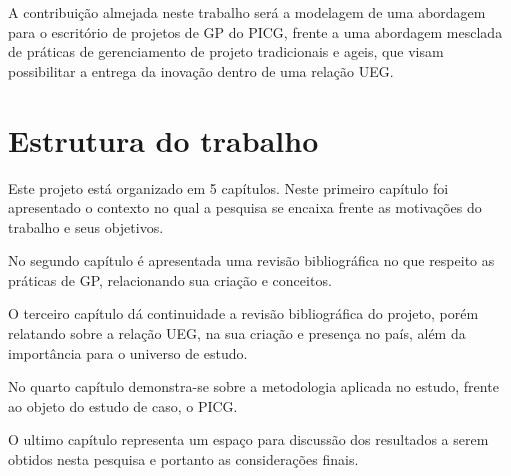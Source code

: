 A contribuição almejada neste trabalho será a modelagem de uma abordagem para o escritório de projetos de GP do PICG, frente a uma abordagem mesclada de práticas de gerenciamento de projeto tradicionais e ageis, que visam possibilitar a entrega da inovação dentro de uma relação UEG.


\section{Estrutura do trabalho}

Este projeto está organizado em 5 capítulos. Neste primeiro capítulo foi apresentado o contexto no qual a pesquisa se encaixa frente as motivações do trabalho e seus objetivos.

No segundo capítulo é apresentada uma revisão bibliográfica no que respeito as práticas de GP, relacionando sua criação e conceitos.

O terceiro capítulo dá continuidade a revisão bibliográfica do projeto, porém relatando sobre a relação UEG, na sua criação e presença no país, além da importância para o universo de estudo.

No quarto capítulo demonstra-se sobre a metodologia aplicada no estudo, frente ao objeto do estudo de caso, o PICG.

O ultimo capítulo representa um espaço para discussão dos resultados a serem obtidos nesta pesquisa e portanto as considerações finais.


